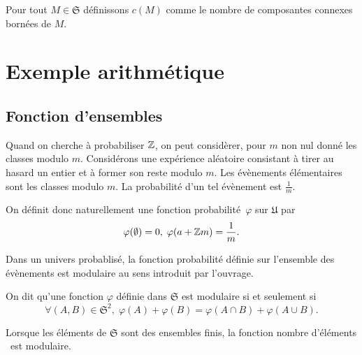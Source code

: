 \begin{defi}
Pour tout $M \in \mathfrak{S}$ définissons $c(M)$ comme le nombre de composantes connexes bornées de $M$.
\end{defi}

\section{Exemple arithmétique}
\subsection{Fonction d'ensembles}
Quand on cherche à probabiliser $\mathbb{Z}$, on peut considèrer, pour $m$ non nul donné les classes modulo $m$. Considérons une expérience aléatoire consistant à tirer au hasard un entier et à former son reste modulo $m$. Les évènements élémentaires sont les classes modulo $m$. La probabilité d'un tel évènement est $\frac{1}{m}$.

On définit donc naturellement une fonction \og probabilité\fg \, $\varphi$ sur $\mathfrak{U}$ par
\begin{displaymath}
  \varphi(\emptyset) = 0, \;\varphi(a + \mathbb{Z} m) = \frac{1}{m}.
\end{displaymath}

Dans un univers probablisé, la fonction probabilité définie sur l'ensemble des évènements est modulaire au sens introduit par l'ouvrage.
\begin{defi}
  On dit qu'une fonction $\varphi$ définie dans $\mathfrak{S}$ est modulaire si et seulement si
  \begin{displaymath}
    \forall (A,B)\in \mathfrak{S}^2,\; \varphi(A) + \varphi(B) = \varphi(A\cap B) + \varphi(A \cup B).
  \end{displaymath}
\end{defi}
\begin{rem}
  Lorsque les éléments de $\mathfrak{S}$ sont des ensembles finis, la fonction \og nombre d'éléments \fg \, est modulaire.
\end{rem}


